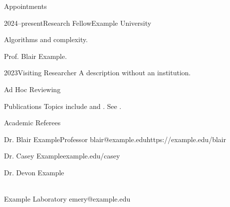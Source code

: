 \documentclass[british,a4paper,11pt]{article}
\begin{document}
\makecvheader

\begin{cvsection}[reserve=6]{Appointments}
  \begin{cventry}{2024--present}{Research Fellow}{Example University}
    \begin{cvitems}
      \item {} Algorithms and complexity.
      \item {} Prof. Blair Example.
    \end{cvitems}
  \end{cventry}
  \begin{cventry}{2023}{Visiting Researcher}{}
    A description without an institution.
  \end{cventry}
\end{cvsection}

\begin{cvsection}{Ad Hoc Reviewing}
\end{cvsection}

\begin{cvsection}[reserve=8]{Publications}
  Topics include  and
  . See
  .
  \nocite{*}
\end{cvsection}

\newpage
\makecvheader

\begin{cvsection}{Academic Referees}
  \begin{cvreferee}{Dr. Blair Example}{Professor}
    {blair@example.edu}{https://example.edu/blair}
  \end{cvreferee}
  \begin{cvreferee}{Dr. Casey Example}{}{}{example.edu/casey}
  \end{cvreferee}
  \begin{cvreferee}{Dr. Devon Example}{}{}{}
  \end{cvreferee}
  {\\Example Laboratory}
  {emery@example.edu}{}
\end{cvsection}
\end{document}
